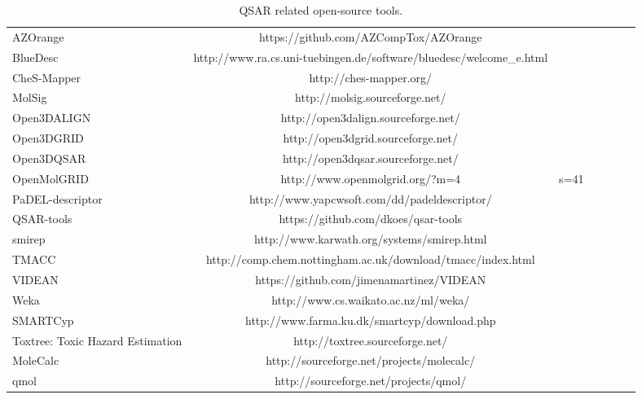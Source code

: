 \begin{table} 
    \begin{tabular}{ l c c c c c c }
        AZOrange & https://github.com/AZCompTox/AZOrange \\ 
        BlueDesc & http://www.ra.cs.uni-tuebingen.de/software/bluedesc/welcome_e.html \\ 
        CheS-Mapper &  http://ches-mapper.org/ \\ 
        MolSig & http://molsig.sourceforge.net/ \\ 
        Open3DALIGN &  http://open3dalign.sourceforge.net/ \\ 
        Open3DGRID &  http://open3dgrid.sourceforge.net/ \\ 
        Open3DQSAR &  http://open3dqsar.sourceforge.net/ \\ 
        OpenMolGRID &  http://www.openmolgrid.org/?m=4&s=41 \\ 
        PaDEL-descriptor &  http://www.yapcwsoft.com/dd/padeldescriptor/ \\ 
        QSAR-tools &  https://github.com/dkoes/qsar-tools \\ 
        smirep &  http://www.karwath.org/systems/smirep.html \\ 
        TMACC &  http://comp.chem.nottingham.ac.uk/download/tmacc/index.html \\ 
        VIDEAN &  https://github.com/jimenamartinez/VIDEAN \\ 
        Weka &  http://www.cs.waikato.ac.nz/ml/weka/ \\ 
        SMARTCyp &  http://www.farma.ku.dk/smartcyp/download.php \\ 
        Toxtree: Toxic Hazard Estimation &  http://toxtree.sourceforge.net/ \\ 
        MoleCalc &  http://sourceforge.net/projects/molecalc/ \\ 
        qmol &  http://sourceforge.net/projects/qmol/ \\ 
    \end{tabular} 
    \caption{\label{qsartable} QSAR related open-source tools.}
\end{table}
